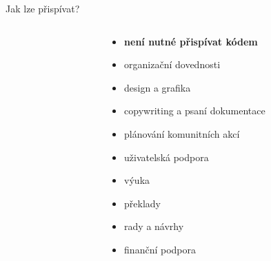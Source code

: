 \documentclass[11pt]{beamer}
\begin{document}
 \begin{frame}{Jak lze přispívat?}
 		\begin{columns}[T]
 		\begin{column}{0.5\textwidth}
 		\end{column}
 	\begin{column}{0.5\textwidth}
 			\begin{itemize}
 			\item \textbf{není nutné přispívat kódem}
 			\item organizační dovednosti
 			\item design a grafika
 			\item copywriting a psaní dokumentace
 			\item plánování komunitních akcí
 			\item uživatelská podpora
 			\item výuka
 			\item překlady
 			\item rady a návrhy
 			\item finanční podpora
 		\end{itemize}
 	\end{column}
 	\end{columns}
\end{frame}
\end{document}
